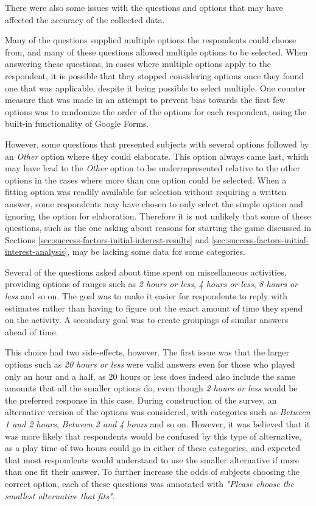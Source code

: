 There were also some issues with the questions and options that may have affected the accuracy of the collected data.

Many of the questions supplied multiple options the respondents could choose from, and many of these questions allowed multiple options to be selected. When answering these questions, in cases where multiple options apply to the respondent, it is possible that they stopped considering options once they found one that was applicable, despite it being possible to select multiple. One counter measure that was made in an attempt to prevent bias towards the first few options was to randomize the order of the options for each respondent, using the built-in functionality of Google Forms.

However, some questions that presented subjects with several options followed by an \emph{Other} option where they could elaborate. This option always came last, which may have lead to the \emph{Other} option to be underrepresented relative to the other options in the cases where more than one option could be selected. When a fitting option was readily available for selection without requiring a written answer, some respondents may have chosen to only select the simple option and ignoring the option for elaboration. Therefore it is not unlikely that some of these questions, such as the one asking about reasons for starting the game discussed in Sections \ref{sec:success-factors-initial-interest-results} and \ref{sec:success-factors-initial-interest-analysis}, may be lacking some data for some categories.

Several of the questions asked about time spent on miscellaneous activities, providing options of ranges such as \emph{2 hours or less}, \emph{4 hours or less}, \emph{8 hours or less} and so on. The goal was to make it easier for respondents to reply with estimates rather than having to figure out the exact amount of time they spend on the activity. A secondary goal was to create groupings of similar answers ahead of time.

This choice had two side-effects, however. The first issue was that the larger options such as \emph{20 hours or less} were valid answers even for those who played only an hour and a half, as 20 hours or less does indeed also include the same amounts that all the smaller options do, even though \emph{2 hours or less} would be the preferred response in this case. During construction of the survey, an alternative version of the options was considered, with categories such as \emph{Between 1 and 2 hours}, \emph{Between 2 and 4 hours} and so on. However, it was believed that it was more likely that respondents would be confused by this type of alternative, as a play time of two hours could go in either of these categories, and expected that most respondents would understand to use the smaller alternative if more than one fit their answer. To further increase the odds of subjects choosing the correct option, each of these questions was annotated with \emph{"Please choose the smallest alternative that fits"}.


